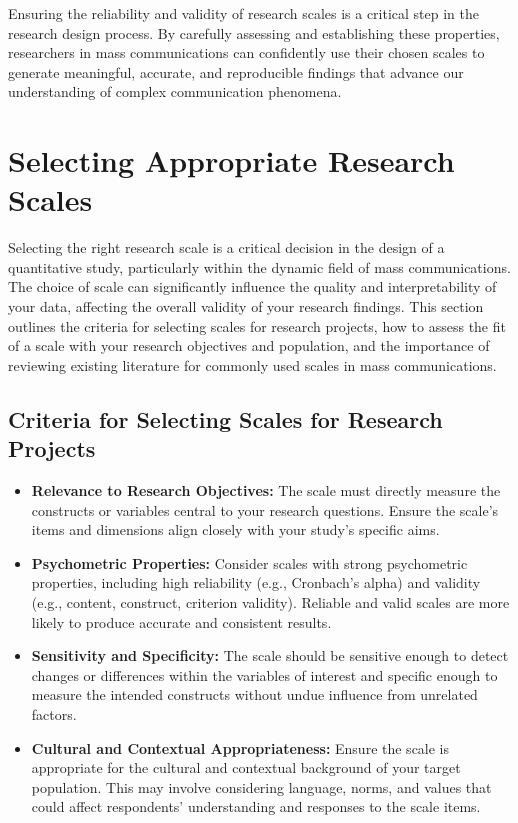 \documentclass[
]{book}
\begin{document}
Ensuring the reliability and validity of research scales is a critical step in the research design process. By carefully assessing and establishing these properties, researchers in mass communications can confidently use their chosen scales to generate meaningful, accurate, and reproducible findings that advance our understanding of complex communication phenomena.

\hypertarget{selecting-appropriate-research-scales}{%
\section{Selecting Appropriate Research Scales}\label{selecting-appropriate-research-scales}}

Selecting the right research scale is a critical decision in the design of a quantitative study, particularly within the dynamic field of mass communications. The choice of scale can significantly influence the quality and interpretability of your data, affecting the overall validity of your research findings. This section outlines the criteria for selecting scales for research projects, how to assess the fit of a scale with your research objectives and population, and the importance of reviewing existing literature for commonly used scales in mass communications.

\hypertarget{criteria-for-selecting-scales-for-research-projects}{%
\subsection*{Criteria for Selecting Scales for Research Projects}\label{criteria-for-selecting-scales-for-research-projects}}

\begin{itemize}
\item
  \textbf{Relevance to Research Objectives:} The scale must directly measure the constructs or variables central to your research questions. Ensure the scale's items and dimensions align closely with your study's specific aims.
\item
  \textbf{Psychometric Properties:} Consider scales with strong psychometric properties, including high reliability (e.g., Cronbach's alpha) and validity (e.g., content, construct, criterion validity). Reliable and valid scales are more likely to produce accurate and consistent results.
\item
  \textbf{Sensitivity and Specificity:} The scale should be sensitive enough to detect changes or differences within the variables of interest and specific enough to measure the intended constructs without undue influence from unrelated factors.
\item
  \textbf{Cultural and Contextual Appropriateness:} Ensure the scale is appropriate for the cultural and contextual background of your target population. This may involve considering language, norms, and values that could affect respondents' understanding and responses to the scale items.
\end{itemize}
\end{document}
